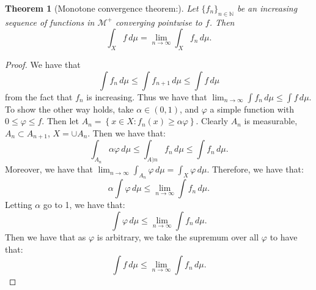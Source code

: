 \documentclass{article}
\newtheorem{theorem}{Theorem}
\theoremstyle{definition}
\numberwithin{theorem}{section}
\numberwithin{equation}{section}
\begin{document}
\begin{theorem}[Monotone convergence theorem:]
	Let $\lbrace f_n \rbrace_{n \in \mathbb{N}}$ be an increasing sequence of functions in $\mathcal{M}^+$ converging pointwise to $f$. Then \begin{equation}
	\int_X f \, d\mu = \lim_{n \rightarrow \infty} \int_X f_n \, d\mu.
\end{equation}
\end{theorem}

\begin{proof}
	We have that
	\begin{equation}
		 \int f_n \, d\mu \leq \int f_{n + 1} \, d\mu \leq \int f \, d\mu
	\end{equation}
	from the fact that $f_n$ is increasing. 
	Thus we have that $\lim_{n \rightarrow \infty} \int f_n \, d\mu \leq \int f \, d\mu$. 
	To show the other way holds, take $\alpha \in (0, 1)$, and $\varphi$ a simple function with $0 \leq \varphi \leq f$. Then let $A_n = \left\{ x \in X : f_n(x) \geq \alpha \varphi \right\}$. Clearly $A_n$ is measurable, $A_n \subset A_{n + 1}$, $X = \cup A_n$. 
	Then we have that:
	\begin{equation}
		\int_{A_n} \alpha \varphi \, d\mu \leq \int_{A)n} f_n \, d\mu \leq \int f_n  \, d\mu. 
	\end{equation}
	Moreover, we have that $\lim_{n \rightarrow \infty} \int_{A_n} \varphi \, d\mu = \int_X \varphi \, d\mu$. 
	Therefore, we have that:
	\begin{equation}
		\alpha \int \varphi \, d\mu \leq \lim_{n \rightarrow \infty} \int f_n \, d\mu.
	\end{equation}
	Letting $\alpha$ go to 1, we have that:
	\begin{equation}
		\int \varphi \, d\mu \leq \lim_{n \rightarrow \infty} \int f_n \, d\mu.
	\end{equation}
	Then we have that as $\varphi$ is arbitrary, we take the supremum over all $\varphi$ to have that:
	\begin{equation}
		\int f \, d\mu \leq \lim_{n \rightarrow \infty} \int f_n \, d\mu.
	\end{equation}
\end{proof}
\end{document}
